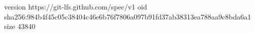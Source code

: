 version https://git-lfs.github.com/spec/v1
oid sha256:984b4f45c05c38404c46e6b76f7806a097b91fd37ab38313ea788aa9c8bda6a1
size 43840

